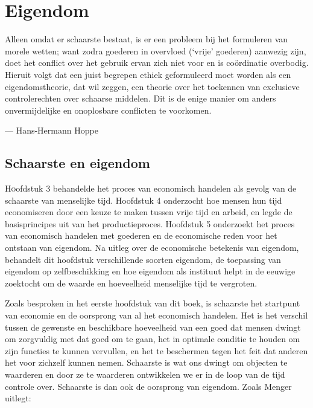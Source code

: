 \chapter{Eigendom}

\begin{blockquotebox}
    Alleen omdat er schaarste bestaat, is er een probleem bij het formuleren van morele wetten; want zodra goederen in overvloed (`vrije' goederen) aanwezig zijn, doet het conflict over het gebruik ervan zich niet voor en is coördinatie overbodig. Hieruit volgt dat een juist begrepen ethiek geformuleerd moet worden als een eigendomstheorie, dat wil zeggen, een theorie over het toekennen van exclusieve controlerechten over schaarse middelen. Dit is de enige manier om anders onvermijdelijke en onoplosbare conflicten te voorkomen.\footnotemark
    \par\raggedleft--- Hans-Hermann Hoppe
\end{blockquotebox}


\section{Schaarste en eigendom}

\lettrine{H}oofdstuk 3 behandelde het proces van economisch handelen als gevolg van de schaarste van menselijke tijd. Hoofdstuk 4 onderzocht hoe mensen hun tijd economiseren door een keuze te maken tussen vrije tijd en arbeid, en legde de basisprincipes uit van het productieproces. Hoofdstuk 5 onderzoekt het proces van economisch handelen met goederen en de economische reden voor het ontstaan van eigendom. Na uitleg over de economische betekenis van eigendom, behandelt dit hoofdstuk verschillende soorten eigendom, de toepassing van eigendom op zelfbeschikking en hoe eigendom als instituut helpt in de eeuwige zoektocht om de waarde en hoeveelheid menselijke tijd te vergroten.

Zoals besproken in het eerste hoofdstuk van dit boek, is schaarste het startpunt van economie en de oorsprong van al het economisch handelen. Het is het verschil tussen de gewenste en beschikbare hoeveelheid van een goed dat mensen dwingt om zorgvuldig met dat goed om te gaan, het in optimale conditie te houden om zijn functies te kunnen vervullen, en het te beschermen tegen het feit dat anderen het voor zichzelf kunnen nemen. Schaarste is wat ons dwingt om objecten te waarderen en door ze te waarderen ontwikkelen we er in de loop van de tijd controle over. Schaarste is dan ook de oorsprong van eigendom. Zoals Menger uitlegt:

